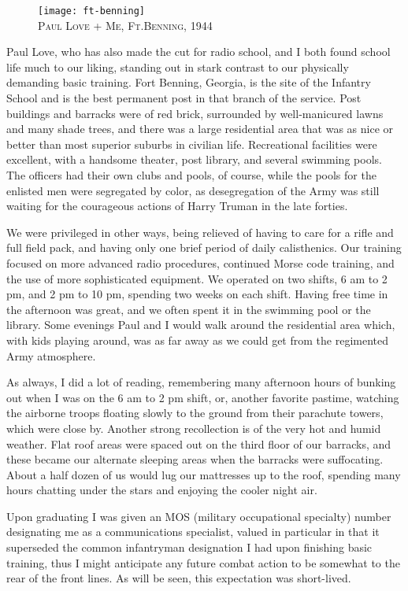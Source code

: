 \documentclass[../m3y]{subfiles}
\begin{document}
\begin{figure}
\centering
\texttt{[image: ft-benning]}\\
\medskip
{\newtimes\textsc{Paul Love + Me, Ft.\thinspace{}Benning, 1944}}
\end{figure}

Paul Love, who has also made the cut for radio school, and I both found school life much to our liking, standing out in stark contrast to our physically demanding basic training. Fort Benning, Georgia, is the site of the Infantry School and is the best permanent post in that branch of the service. Post buildings and barracks were of red brick, surrounded by well-manicured lawns and many shade trees, and there was a large residential area that was as nice or better than most superior suburbs in civilian life. Recreational facilities were excellent, with a handsome theater, post library, and several swimming pools. The officers had their own clubs and pools, of course, while the pools for the enlisted men were segregated by color, as desegregation of the Army was still waiting for the courageous actions of Harry Truman in the late forties.

We were privileged in other ways, being relieved of having to care for a rifle and full field pack, and having only one brief period of daily calisthenics. Our training focused on more advanced radio procedures, continued Morse code training, and the use of more sophisticated equipment. We operated on two shifts, 6 am to 2 pm, and 2 pm to 10 pm, spending two weeks on each shift. Having free time in the afternoon was great, and we often spent it in the swimming pool or the library. Some evenings Paul and I would walk around the residential area which, with kids playing around, was as far away as we could get from the regimented Army atmosphere.

As always, I did a lot of reading, remembering many afternoon hours of bunking out when I was on the 6 am to 2 pm shift, or, another favorite pastime, watching the airborne troops floating slowly to the ground from their parachute towers, which were close by. Another strong recollection is of the very hot and humid weather. Flat roof areas were spaced out on the third floor of our barracks, and these became our alternate sleeping areas when the barracks were suffocating. About a half dozen of us would lug our mattresses up to the roof, spending many hours chatting under the stars and enjoying the cooler night air.

Upon graduating I was given an MOS (military occupational specialty) number designating me as a communications specialist, valued in particular in that it superseded the common infantryman designation I had upon finishing basic training, thus I might anticipate any future combat action to be somewhat to the rear of the front lines. As will be seen, this expectation was short-lived.
\end{document}
